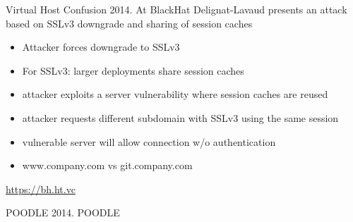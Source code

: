 \begin{frame}{Virtual Host Confusion}
  2014. At BlackHat Delignat-Lavaud presents an attack based on SSLv3 downgrade and sharing of session caches
  \begin{itemize}
    \item Attacker forces downgrade to SSLv3
    \item For SSLv3: larger deployments share session caches
    \item attacker exploits a server vulnerability where session caches are reused
    \item attacker requests different subdomain with SSLv3 using the same session
    \item vulnerable server will allow connection w/o authentication
    \item www.company.com vs git.company.com
  \end{itemize}
  \tiny
  \url{https://bh.ht.vc}
\end{frame}

\begin{frame}{POODLE}
  2014. POODLE
\end{frame}

